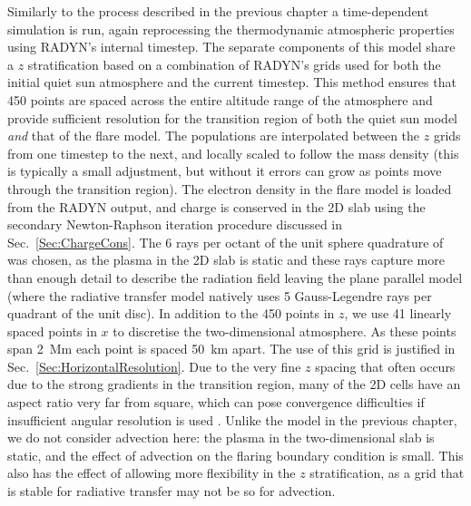 Similarly to the process described in the previous chapter a time-dependent simulation is run, again reprocessing the thermodynamic atmospheric properties using RADYN's internal timestep.
The separate components of this model share a $z$ stratification based on a combination of RADYN's grids used for both the initial quiet sun atmosphere and the current timestep.
This method ensures that 450 points are spaced across the entire altitude range of the atmosphere and provide sufficient resolution for the transition region of both the quiet sun model \emph{and} that of the flare model.
The populations are interpolated between the $z$ grids from one timestep to the next, and locally scaled to follow the mass density (this is typically a small adjustment, but without it errors can grow as points move through the transition region).
The electron density in the flare model is loaded from the RADYN output, and charge is conserved in the 2D slab using the secondary Newton-Raphson iteration procedure discussed in Sec.~\ref{Sec:ChargeCons}.
The 6 rays per octant of the unit sphere quadrature of \citet{Stepan2020} was chosen, as the plasma in the 2D slab is static and these rays capture more than enough detail to describe the radiation field leaving the plane parallel model (where the radiative transfer model natively uses 5 Gauss-Legendre rays per quadrant of the unit disc).
In addition to the 450 points in $z$, we use 41 linearly spaced points in $x$ to discretise the two-dimensional atmosphere.
As these points span \SI{2}{\mega\metre} each point is spaced \SI{50}{\kilo\metre} apart.
The use of this grid is justified in Sec.~\ref{Sec:HorizontalResolution}.
Due to the very fine $z$ spacing that often occurs due to the strong gradients in the transition region, many of the 2D cells have an aspect ratio very far from square, which can pose convergence difficulties if insufficient angular resolution is used .
Unlike the model in the previous chapter, we do not consider advection here: the plasma in the two-dimensional slab is static, and the effect of advection on the flaring boundary condition is small.
This also has the effect of allowing more flexibility in the $z$ stratification, as a grid that is stable for radiative transfer may not be so for advection.

